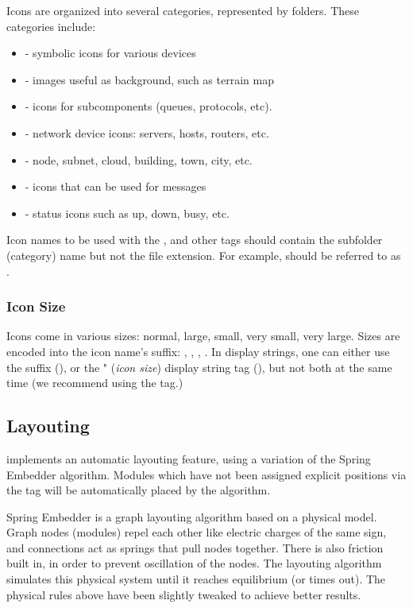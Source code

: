 Icons are organized into several categories, represented by folders.
These categories include:

\begin{itemize}
  \item {} - symbolic icons for various devices
  \item {} - images useful as background, such as terrain map
  \item {} - icons for subcomponents (queues, protocols, etc).
  \item {} - network device icons: servers, hosts, routers, etc.
  \item {} - node, subnet, cloud, building, town, city, etc.
  \item {} - icons that can be used for messages
  \item {} - status icons such as up, down, busy, etc.
\end{itemize}

Icon names to be used with the ,  and other tags should
contain the subfolder (category) name but not the file extension. For
example,  should be referred to as
.


\subsubsection{Icon Size}
\label{sec:graphics:icon-size}

Icons come in various sizes: normal, large, small, very small, very large.
Sizes are encoded into the icon name's suffix: , ,
, . In display strings, one can either use the suffix
(), or the " (\textit{icon size})
display string tag (), but not both at the same
time (we recommend using the  tag.)


\subsection{Layouting}
\label{sec:graphics:compound-module-layouting}

{\opp} implements an automatic layouting feature, using a variation of the
Spring Embedder algorithm. Modules which have not been assigned explicit
positions via the  tag will be automatically placed by the
algorithm.

Spring Embedder is a graph layouting algorithm based on a physical model.
Graph nodes (modules) repel each other like electric charges of the same
sign, and connections act as springs that pull nodes together. There is
also friction built in, in order to prevent oscillation of the nodes. The
layouting algorithm simulates this physical system until it reaches
equilibrium (or times out). The physical rules above have been slightly
tweaked to achieve better results.


